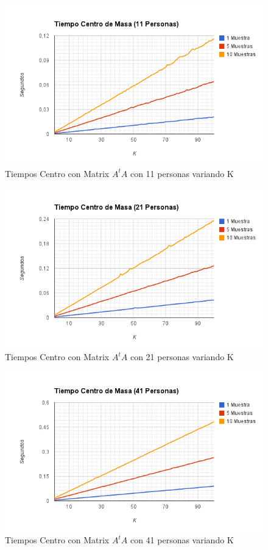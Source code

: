 \begin{figure}[H]
\includegraphics[width=1\textwidth]{img/image7.png}
     \caption{Tiempos Centro con Matrix $A^tA$ con 11 personas variando K}
\end{figure}

\begin{figure}[H]
\includegraphics[width=1\textwidth]{img/image8.png}
     \caption{Tiempos Centro con Matrix $A^tA$ con 21 personas variando K}
\end{figure}

\begin{figure}[H]
\includegraphics[width=1\textwidth]{img/image9.png}
     \caption{Tiempos Centro con Matrix $A^tA$ con 41 personas variando K}
\end{figure}

